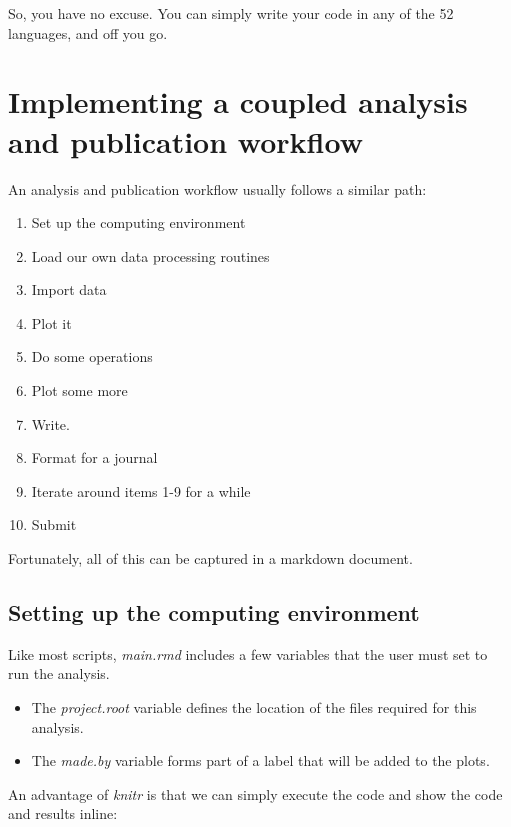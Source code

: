 \documentclass[10pt,]{article}
\providecommand{\tightlist}{%
  \setlength{\itemsep}{0pt}\setlength{\parskip}{0pt}}
\begin{document}
So, you have no excuse. You can simply write your code in any of the 52 languages, and off you go.

\hypertarget{implementing-a-coupled-analysis-and-publication-workflow}{%
\section{Implementing a coupled analysis and publication workflow}\label{implementing-a-coupled-analysis-and-publication-workflow}}

An analysis and publication workflow usually follows a similar path:

\begin{enumerate}
\def\labelenumi{\arabic{enumi}.}
\tightlist
\item
  Set up the computing environment
\item
  Load our own data processing routines
\item
  Import data
\item
  Plot it
\item
  Do some operations
\item
  Plot some more
\item
  Write.
\item
  Format for a journal
\item
  Iterate around items 1-9 for a while
\item
  Submit
\end{enumerate}

Fortunately, all of this can be captured in a markdown document.

\hypertarget{setting-up-the-computing-environment}{%
\subsection{Setting up the computing environment}\label{setting-up-the-computing-environment}}

Like most scripts, \emph{main.rmd} includes a few variables that the user must set to run the analysis.

\begin{itemize}
\tightlist
\item
  The \emph{project.root} variable defines the location of the files required for this analysis.
\item
  The \emph{made.by} variable forms part of a label that will be added to the plots.
\end{itemize}

An advantage of \emph{knitr} is that we can simply execute the code and show the code and results inline:
\end{document}
